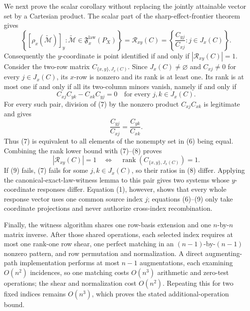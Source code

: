 We next prove the scalar corollary without replacing the jointly attainable vector set by a Cartesian product. The scalar part of the sharp-effect-frontier theorem gives
\[
 \left\{[\rho_x(\widetilde{\mathcal M})]_y:
 \widetilde{\mathcal M}\in\mathfrak F_x^{\mathrm{law}}(P_X)\right\}
 =\mathcal R_{xy}(C)
 =\left\{\frac{C_{yj}}{C_{xj}}:j\in J_x(C)\right\}. \tag{6}
\]
Consequently the \(y\)-coordinate is point identified if and only if \(|\mathcal R_{xy}(C)|=1\). Consider the two-row matrix \(C_{\{x,y\},J_x(C)}\). Since \(J_x(C)\ne\varnothing\) and \(C_{xj}\ne0\) for every \(j\in J_x(C)\), its \(x\)-row is nonzero and its rank is at least one. Its rank is at most one if and only if all its two-column minors vanish, namely if and only if
\[
 C_{xj}C_{yk}-C_{xk}C_{yj}=0
 \quad\text{for every }j,k\in J_x(C). \tag{7}
\]
For every such pair, division of (7) by the nonzero product \(C_{xj}C_{xk}\) is legitimate and gives
\[
 \frac{C_{yj}}{C_{xj}}=\frac{C_{yk}}{C_{xk}}. \tag{8}
\]
Thus (7) is equivalent to all elements of the nonempty set in (6) being equal. Combining the rank lower bound with (7)--(8) proves
\[
 |\mathcal R_{xy}(C)|=1
 \quad\Longleftrightarrow\quad
 \operatorname{rank}\!\left(C_{\{x,y\},J_x(C)}\right)=1. \tag{9}
\]
If (9) fails, (7) fails for some \(j,k\in J_x(C)\), so their ratios in (8) differ. Applying the canonical-exact-law-witness lemma to this pair gives two systems whose \(y\)-coordinate responses differ. Equation (1), however, shows that every whole response vector uses one common source index \(j\); equations (6)--(9) only take coordinate projections and never authorize cross-index recombination.

Finally, the witness algorithm shares one row-basis extension and one \(n\)-by-\(n\) matrix inverse. After those shared operations, each selected index requires at most one rank-one row shear, one perfect matching in an \((n-1)\)-by-\((n-1)\) nonzero pattern, and row permutation and normalization. A direct augmenting-path implementation performs at most \(n-1\) augmentations, each examining \(O(n^2)\) incidences, so one matching costs \(O(n^3)\) arithmetic and zero-test operations; the shear and normalization cost \(O(n^2)\). Repeating this for two fixed indices remains \(O(n^3)\), which proves the stated additional-operation bound.